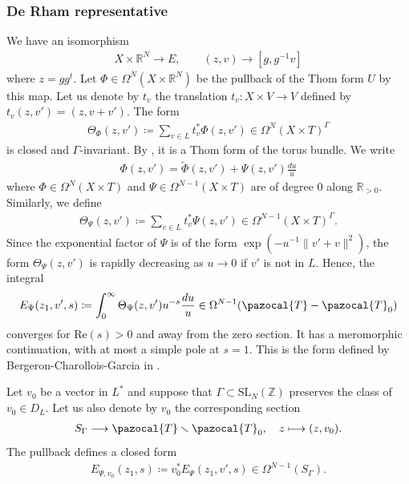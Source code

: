 \documentclass[a4paper,11pt]{amsart} %
\newcommand{\8}{\infty}
\newcommand{\Z}{\mathbb{Z}}
\newcommand{\SL}{\mathrm{SL}}
\newcommand{\R}{\mathbb{R}}
\newcommand{\Tcal}{\pazocal{T}}
\newcommand{\re}{\mathrm{Re}}
\theoremstyle{mytheoremstyle}
\theoremstyle{remark}
\numberwithin{equation}{section}
\begin{document}
\subsubsection{De Rham representative} We have an isomorphism
\begin{align} \label{iso bundle}
 X \times \R^N \longrightarrow E, \qquad (z,v)  \longrightarrow [g,g^{-1}v]
\end{align}
where $z=gg^t$. Let $\Phi \in \Omega^N(X \times \R^N)$ be the pullback of the Thom form $U$ by this map. Let us denote by $t_{v}$ the translation $t_{v} \colon X \times V \longrightarrow V$ defined by $t_{v}(z,v')=(z,v+v')$.  The form
\begin{align}
\Theta_\Phi(z,v') \coloneqq \sum_{v \in L} t_{v}^\ast \Phi(z,v') \in \Omega^N(X \times T)^{\Gamma}
\end{align}
is closed and $\Gamma$-invariant. By \cite[Proposition.~16]{bcg},  it is a Thom form of the torus bundle. We write
\begin{align}
\Phi(z,v')=\widetilde{\Phi}(z,v')+\Psi(z,v')\frac{du}{u}
\end{align}
where $\Phi \in \Omega^{N}(X \times T)$ and $\Psi \in \Omega^{N-1}(X \times T)$ are of degree $0$ along $\R_{>0}$. Similarly, we define
\begin{align}
\Theta_\Psi(z,v') \coloneqq \sum_{v \in L} t_{v}^\ast \Psi(z,v') \in \Omega^{N-1}(X \times T)^{\Gamma}.
\end{align}
Since the exponential factor of $\Psi$ is of the form $\exp(-u^{-1}\lVert v'+v\rVert^2)$, the form $\Theta_\Psi(z,v')$ is rapidly decreasing as $u \rightarrow 0$ if $v'$ is not in $L$. Hence, the integral
\begin{align}
E_{\Psi}(z_1,v',s) \coloneqq \int_0^\8 \Theta_\Psi(z,v') u^{-s}\frac{du}{u} \in \Omega^{N-1}(\Tcal-\Tcal_0)
\end{align}
converges for $\re(s)>0$ and away from the zero section. It has a meromorphic continuation, with at most a simple pole at $s=1$. This is the form defined by Bergeron-Charollois-Garcia in  \cite[section.~8.5]{bcg}. 

Let $v_0$ be a vector in $L^\ast$ and suppose that $\Gamma \subset \SL_N(\Z)$ preserves the class of $v_0 \in D_L$. Let us also denote by $v_0$ the corresponding section 
\begin{align}
S_\Gamma \longrightarrow \Tcal \smallsetminus \Tcal_0, \quad z \longmapsto (z,v_0).
\end{align}
The pullback defines a closed form
\begin{align}
E_{\Psi,v_0}(z_1,s)\coloneqq v_0^\ast E_\Psi(z_1,v',s) \in \Omega^{N-1}(S_\Gamma).
\end{align}
\end{document}
